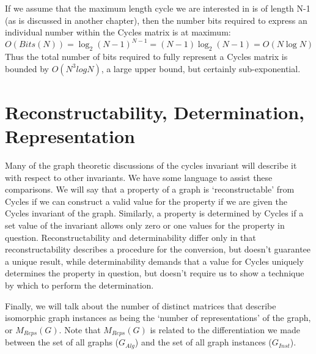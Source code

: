 If we assume that the maximum length cycle we are interested in is of length N-1 (as is discussed in another chapter), then the number bits required to express an individual number within the Cycles matrix is at maximum:
$$ O(Bits(N)) = \log_2 (N-1)^{N-1} = (N - 1) \log_2 (N-1) = O(N \log N)$$
Thus the total number of bits required to fully represent a Cycles matrix is bounded by $O(N^3logN)$, a large upper bound, but certainly sub-exponential.


\section{Reconstructability, Determination, Representation}
Many of the graph theoretic discussions of the cycles invariant will describe it with respect to other invariants. We have some language to assist these comparisons.
We will say that a property of a graph is `reconstructable' from Cycles if we can construct a valid value for the property if we are given the Cycles invariant of the graph.
Similarly, a property is determined by Cycles if a set value of the invariant allows only zero or one values for the property in question.
Reconstructability and determinability differ only in that reconstructability describes a procedure for the conversion, but doesn't guarantee a unique result, while determinability demands that a value for Cycles uniquely determines the property in question, but doesn't require us to show a technique by which to perform the determination.

Finally, we will talk about the number of distinct matrices that describe isomorphic graph instances as being the `number of representations' of the graph, or $M_{Reps}(G)$.
Note that  $M_{Reps}(G)$ is related to the differentiation we made between the set of all graphs ($G_{Alg}$) and the set of all graph instances ($G_{Inst}$).